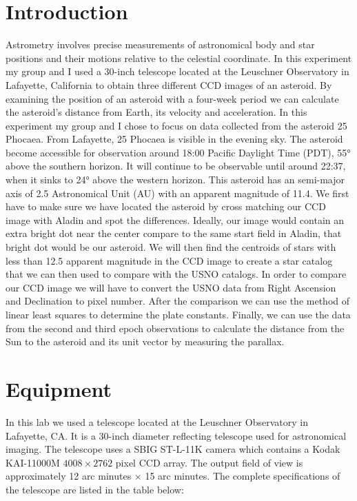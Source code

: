 \documentclass[onecolumn, 12pt, a4paper]{article}
\begin{document}
\section{Introduction}  \label{introduction}
Astrometry involves precise measurements of astronomical body and star positions and their motions relative to the celestial coordinate. In this experiment my group and I used a 30-inch telescope located at the Leuschner Observatory in Lafayette, California to obtain three different CCD images of an asteroid. By examining the position of an asteroid with a four-week period we can calculate the asteroid's distance from Earth, its velocity and acceleration. In this experiment my group and I chose to focus on data collected from the asteroid 25 Phocaea. From Lafayette, 25 Phocaea is visible in the evening sky. The asteroid become accessible for observation around 18:00 Pacific Daylight Time (PDT), \ang{55} above the southern horizon. It will continue to be observable until around 22:37, when it sinks to \ang{24} above the western horizon. This asteroid has an semi-major axis of 2.5 Astronomical Unit (AU) with an apparent magnitude of 11.4. We first have to make sure we have located the asteroid by cross matching our CCD image with Aladin and spot the differences. Ideally, our image would contain an extra bright dot near the center compare to the same start field in Aladin, that bright dot would be our asteroid. We will then find the centroids of stars with less than 12.5 apparent magnitude in the CCD image to create a star catalog that we can then used to compare with the USNO catalogs. In order to compare our CCD image we will have to convert the USNO data from Right Ascension and Declination to pixel number. After the comparison we can use the method of linear least squares to determine the plate constants. Finally, we can use the data from the second and third epoch observations to calculate the distance from the Sun to the asteroid and its unit vector by measuring the parallax.

\section{Equipment} \label{Equipment}
In this lab we used a telescope located at the Leuschner Observatory in Lafayette, CA. It is a 30-inch diameter reflecting telescope used for astronomical imaging. The telescope uses a SBIG ST-L-11K camera which contains a Kodak KAI-11000M $4008 \times 2762$ pixel CCD array. The output field of view is approximately 12 arc minutes $\times$ 15 arc minutes. The complete specifications of the telescope are listed in the table below:  \newline
\end{document}
